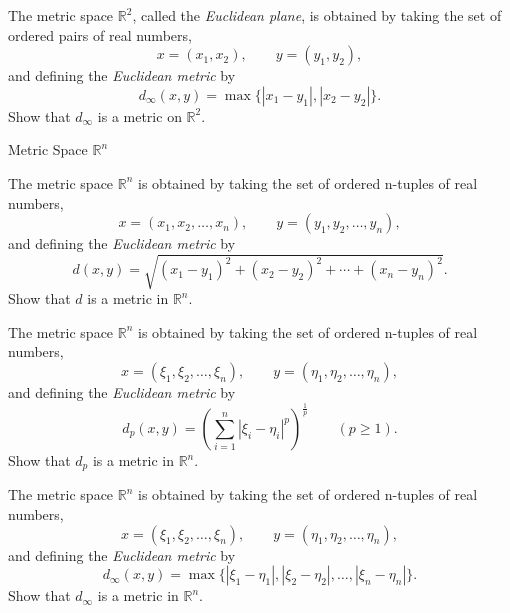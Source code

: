 \documentclass[12pt, a4paper]{article}
\begin{document}
\clearpage

\begin{theorem}
    The metric space $\mathbb{R}^2$, called the \emph{Euclidean plane}, is obtained by
    taking the set of ordered pairs of real numbers,
    \[
    x=(x_1,x_2), \qquad y=(y_1,y_2),
    \]
    and defining the \emph{Euclidean metric} by
    \[
    d_\infty(x,y)=\max\{|x_1-y_1|,|x_2-y_2|\}.
    \]
    Show that $d_{\infty}$ is a metric on $\mathbb{R}^2$.
\end{theorem}

\clearpage

\begin{heading}
    Metric Space $\mathbb{R}^n$
\end{heading}

\vspace{10pt}

\begin{theorem}
    The metric space $\mathbb{R}^n$ is obtained by taking the set of ordered n-tuples of
    real numbers,
    \[
    x=(x_1,x_2,\ldots,x_n), \qquad y=(y_1,y_2,\ldots,y_n),
    \]
    and defining the \emph{Euclidean metric} by
    \[
    d(x,y)=\sqrt{(x_1-y_1)^2+(x_2-y_2)^2+\cdots+(x_n-y_n)^2}.
    \]    
    Show that $d$ is a metric in $\mathbb{R}^n$.
\end{theorem}

\clearpage

\begin{theorem}
    The metric space $\mathbb{R}^n$ is obtained by taking the set of ordered n-tuples of
    real numbers,
    \[
    x=(\xi_1,\xi_2,\ldots,\xi_n), \qquad y=(\eta_1,\eta_2,\ldots,\eta_n),
    \]
    and defining the \emph{Euclidean metric} by
    \[
    d_p(x,y)=\left(\sum_{i=1}^{n}|\xi_i-\eta_i|^p\right)^{\frac{1}{p}} \qquad (p\ge 1).
    \]
    Show that $d_p$ is a metric in $\mathbb{R}^n$.
\end{theorem}

\clearpage

\begin{theorem}
    The metric space $\mathbb{R}^n$ is obtained by taking the set of ordered n-tuples of
    real numbers,
    \[
    x=(\xi_1,\xi_2,\ldots,\xi_n), \qquad y=(\eta_1,\eta_2,\ldots,\eta_n),
    \]
    and defining the \emph{Euclidean metric} by
    \[
    d_\infty(x,y)=\max\{|\xi_1-\eta_1|,|\xi_2-\eta_2|,\ldots,|\xi_n-\eta_n|\}.
    \]
    Show that $d_{\infty}$ is a metric in $\mathbb{R}^n$.
\end{theorem}
\end{document}
